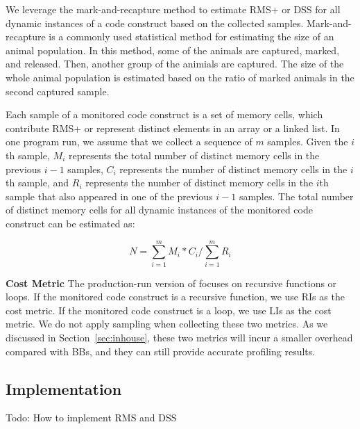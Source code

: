 We leverage the mark-and-recapture method\citep{mark-recapture} to 
estimate RMS+ or DSS for all dynamic instances of a code construct 
based on the collected samples. 
Mark-and-recapture is a commonly used statistical method 
for estimating the size of an animal population. 
In this method, some of the animals are captured, marked, and released. 
Then, another group of the animials are captured.
The size of the whole animal population is estimated 
based on the ratio of marked animals in the second captured sample.  


Each sample of a monitored code construct is a set of memory cells, 
which contribute RMS+ or represent distinct elements in an array or a linked list. 
In one program run, we assume that we collect a sequence of $m$ samples. 
Given the $i$th sample, $M_i$ represents the 
total number of distinct memory cells in the previous $i-1$ samples, 
$C_i$ represents the number of distinct memory cells in the $i$th sample,
and $R_i$ represents the number of distinct memory cells in 
the $i$th sample that also appeared in one of the previous $i-1$ samples.
The total number of distinct memory cells for all dynamic instances 
of the monitored code construct can be estimated as:



\begin{equation} \label{eq:mark}
N = \sum\limits_{i=1}^m M_i*C_i\Big/\sum\limits_{i=1}^m R_i
\end{equation}

\noindent\textbf{Cost Metric}
The production-run version of \Tool focuses on recursive functions or loops.
If the monitored code construct is a recursive function,
we use RIs as the cost metric.
If the monitored code construct is a loop, 
we use LIs as the cost metric. 
We do not apply sampling when collecting these two metrics. 
As we discussed in Section~\ref{sec:inhouse},
these two metrics will incur a smaller overhead compared with BBs, 
and they can still provide accurate profiling results.  


\subsection{Implementation}

{\color{red} Todo: How to implement RMS and DSS}

